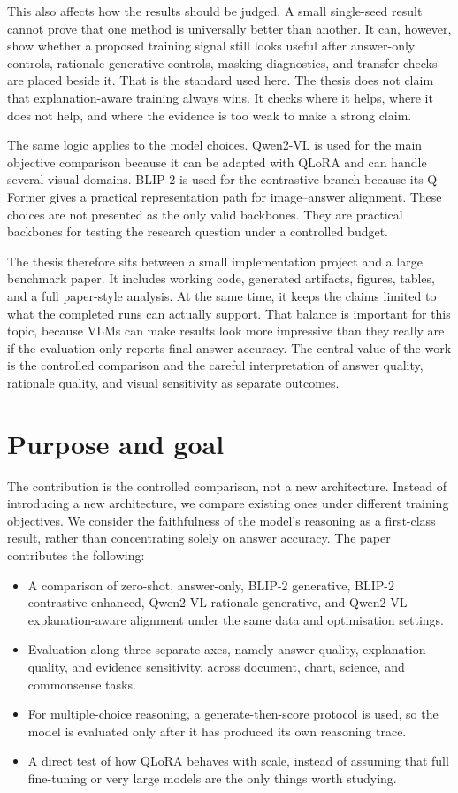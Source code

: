 This also affects how the results should be judged.
A small single-seed result cannot prove that one method is universally better than another.
It can, however, show whether a proposed training signal still looks useful after answer-only controls, rationale-generative controls, masking diagnostics, and transfer checks are placed beside it.
That is the standard used here.
The thesis does not claim that explanation-aware training always wins.
It checks where it helps, where it does not help, and where the evidence is too weak to make a strong claim.

The same logic applies to the model choices.
Qwen2-VL is used for the main objective comparison because it can be adapted with QLoRA and can handle several visual domains.
BLIP-2 is used for the contrastive branch because its Q-Former gives a practical representation path for image--answer alignment.
These choices are not presented as the only valid backbones.
They are practical backbones for testing the research question under a controlled budget.

The thesis therefore sits between a small implementation project and a large benchmark paper.
It includes working code, generated artifacts, figures, tables, and a full paper-style analysis.
At the same time, it keeps the claims limited to what the completed runs can actually support.
That balance is important for this topic, because VLMs can make results look more impressive than they really are if the evaluation only reports final answer accuracy.
The central value of the work is the controlled comparison and the careful interpretation of answer quality, rationale quality, and visual sensitivity as separate outcomes.

\section{Purpose and goal}
The contribution is the controlled comparison, not a new architecture.
Instead of introducing a new architecture, we compare existing ones under different training objectives.
We consider the faithfulness of the model's reasoning as a first-class result, rather than concentrating solely on answer accuracy.
The paper contributes the following:

\begin{itemize}
    \item A comparison of zero-shot, answer-only, BLIP-2 generative, BLIP-2 contrastive-enhanced, Qwen2-VL rationale-generative, and Qwen2-VL explanation-aware alignment under the same data and optimisation settings.
    \item Evaluation along three separate axes, namely answer quality, explanation quality, and evidence sensitivity, across document, chart, science, and commonsense tasks.
    \item For multiple-choice reasoning, a generate-then-score protocol is used, so the model is evaluated only after it has produced its own reasoning trace.
    \item A direct test of how QLoRA behaves with scale, instead of assuming that full fine-tuning or very large models are the only things worth studying.
\end{itemize}

